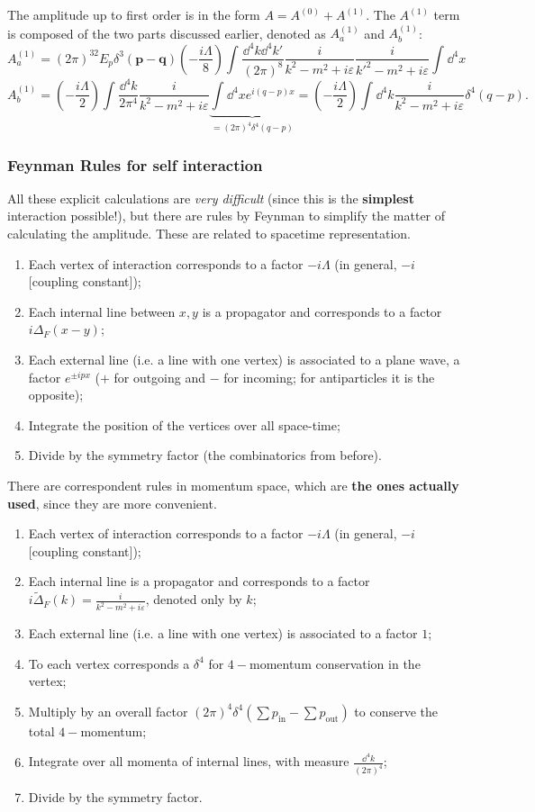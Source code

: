The amplitude up to first order is in the form $A = A^{(0)}+A^{(1)}$. The
$A^{(1)}$ term is composed of the two parts discussed earlier, denoted as
$A^{(1)}_a$ and $A^{(1)}_b$:
$$A_a^{(1)} = (2\pi)^32E_p\delta^3(\mathbf{p-q}) \left(-\frac{i\Lambda}{8}\right)
\int_{}^{} \frac{\dd^4k\dd^4k'}{(2\pi)^8}\frac{i}{k^2-m^2+i\varepsilon}
\frac{i}{k'^2-m^2+i\varepsilon}\int_{}^{} \dd^4x$$
$$A_b^{(1)} = \left(-\frac{i\Lambda}{2}\right)\int_{}^{} \frac{\dd^4k}{2\pi^4}
\frac{i}{k^2-m^2+i\varepsilon}\underbrace{\int_{}^{} \dd^4x e^{i(q-p)x}}_{=
(2\pi)^4\delta^4(q-p)}=
\left(-\frac{i\Lambda}{2}\right)\int_{}^{}
\dd^4k\frac{i}{k^2-m^2+i\varepsilon}\delta^4(q-p).$$
\subsubsection{Feynman Rules for self interaction}
All these explicit calculations are \textit{very difficult} (since this is
the \textbf{simplest} interaction possible!), but there are rules by Feynman
to simplify the matter of calculating the amplitude.
These are related to spacetime representation.
\begin{enumerate}
    \item Each vertex of interaction corresponds to a factor $-i\Lambda$ (in
        general, $-i$[coupling constant]);
    \item Each internal line between $x,y$ is a propagator and corresponds to
        a factor $i\Delta_F(x-y)$;
    \item Each external line (i.e. a line with one vertex) is associated to a
        plane wave, a factor $e^{\pm ipx}$ ($+$ for outgoing and $-$ for
        incoming; for antiparticles it is the opposite);
    \item Integrate the position of the vertices over all space-time;
    \item Divide by the symmetry factor (the combinatorics from before).
\end{enumerate}
There are correspondent rules in momentum space, which are \textbf{the ones
actually used}, since they are more convenient.
\begin{enumerate}
    \item Each vertex of interaction corresponds to a factor $-i\Lambda$ (in
        general, $-i$[coupling constant]);
    \item Each internal line is a propagator and corresponds to
        a factor $i\tilde{\Delta}_F(k) = \frac{i}{k^2-m^2+i\varepsilon}$, denoted
        only by $k$;
    \item Each external line (i.e. a line with one vertex) is associated to a
        factor $1$;
    \item To each vertex corresponds a $\delta^4$ for $4-$momentum conservation
        in the vertex;
    \item Multiply by an overall factor $(2\pi)^4\delta^4\left(
        \sum p_\text{in} - \sum p_\text{out}\right)$ to conserve
        the total $4-$momentum;
    \item Integrate over all momenta of internal lines, with measure
        $\frac{\dd^4k}{(2\pi)^4}$;
    \item Divide by the symmetry factor.
\end{enumerate}
